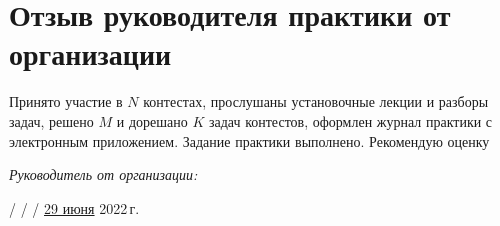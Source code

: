 \section{Отзыв руководителя практики от организации}

Принято участие в $N$ контестах, прослушаны установочные лекции и разборы задач, решено $M$ и дорешано $K$ задач контестов, оформлен журнал практики с электронным приложением. Задание практики выполнено. Рекомендую оценку

\vspace{10pt}

\textit{Руководитель от организации:}

 /  /  / \underline{29 июня} 2022\,г.

\pagebreak
